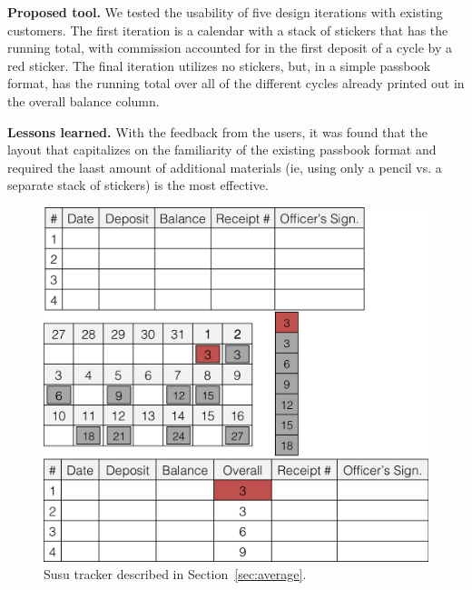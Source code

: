 \documentclass{sig-alternate}
\begin{document}
\textbf{Proposed tool.}
We tested the usability of five design iterations with existing customers. 
The first iteration is a calendar with a stack of stickers that has the running total, with commission accounted for in the first deposit of a cycle by a red sticker. The final iteration utilizes no stickers, but, in a simple passbook format, has the running total over all of the different cycles already printed out in the overall balance column. 



\textbf{Lessons learned.}
With the feedback from the users, it was found that the layout that capitalizes on the familiarity of the existing passbook format and required the laast amount of additional materials (ie, using only a pencil vs. a separate stack of stickers) is the most effective.


\begin{figure}
\centering
\includegraphics[width=.8\linewidth]{img/susu.png}
\caption{Susu tracker described in Section~\ref{sec:average}.}
\label{fig:average}
\end{figure}
\end{document}
